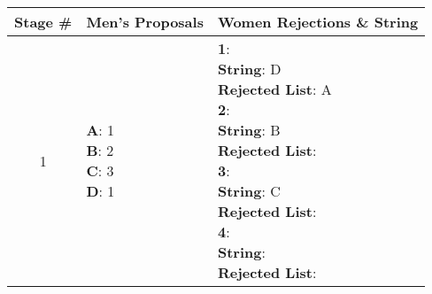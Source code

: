 \documentclass{article}
\begin{document}
\begin{center}
    \begin{longtable}{ c|l|l }
        \textbf{Stage \#} & \textbf{Men's Proposals} & \textbf{Women Rejections \& String} \\
        \hline

        1 & \makecell{\textbf{A}: 1 \\ \textbf{B}: 2 \\ \textbf{C}: 3 \\ \textbf{D}: 1} &  
        \makecell{\textbf{1}:\\ \hspace{10mm} \textbf{String}: D \\ \hspace{10mm} \textbf{Rejected List}: A \\
                    \textbf{2}:\\ \hspace{10mm} \textbf{String}: B \\ \hspace{10mm} \textbf{Rejected List}: \\
                    \textbf{3}:\\ \hspace{10mm} \textbf{String}: C \\ \hspace{10mm} \textbf{Rejected List}: \\
                    \textbf{4}:\\ \hspace{10mm} \textbf{String}:  \\ \hspace{10mm} \textbf{Rejected List}: \\} \\
        \hline 


\end{longtable}
\end{center}
\end{document}
